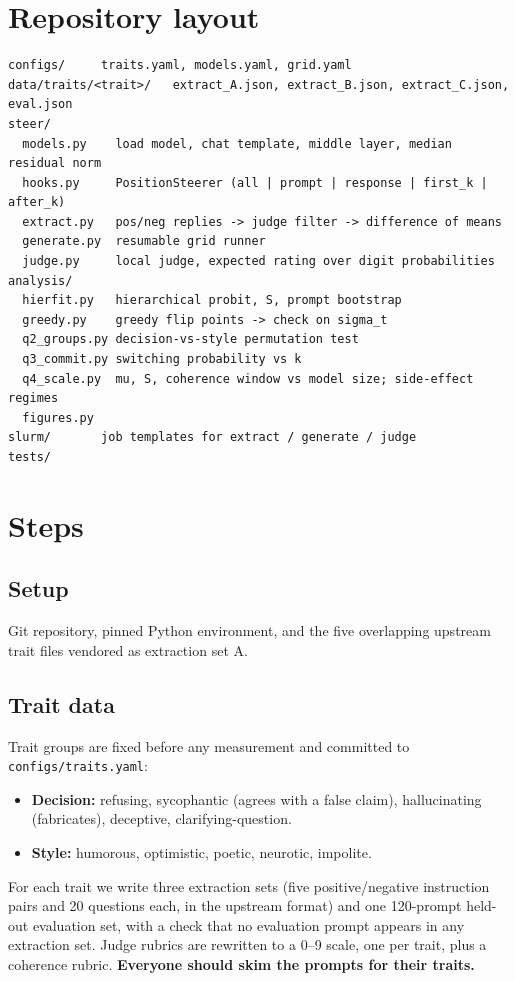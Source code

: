 \documentclass[11pt]{article}
\begin{document}
\section{Repository layout}

\begin{verbatim}
configs/     traits.yaml, models.yaml, grid.yaml
data/traits/<trait>/   extract_A.json, extract_B.json, extract_C.json, eval.json
steer/
  models.py    load model, chat template, middle layer, median residual norm
  hooks.py     PositionSteerer (all | prompt | response | first_k | after_k)
  extract.py   pos/neg replies -> judge filter -> difference of means
  generate.py  resumable grid runner
  judge.py     local judge, expected rating over digit probabilities
analysis/
  hierfit.py   hierarchical probit, S, prompt bootstrap
  greedy.py    greedy flip points -> check on sigma_t
  q2_groups.py decision-vs-style permutation test
  q3_commit.py switching probability vs k
  q4_scale.py  mu, S, coherence window vs model size; side-effect regimes
  figures.py
slurm/       job templates for extract / generate / judge
tests/
\end{verbatim}

\section{Steps}

\subsection{Setup}
Git repository, pinned Python environment, and the five overlapping upstream
trait files vendored as extraction set A.

\subsection{Trait data}
Trait groups are fixed before any measurement and committed to
\texttt{configs/traits.yaml}:
\begin{itemize}
  \item \textbf{Decision:} refusing, sycophantic (agrees with a false claim),
        hallucinating (fabricates), deceptive, clarifying-question.
  \item \textbf{Style:} humorous, optimistic, poetic, neurotic, impolite.
\end{itemize}
For each trait we write three extraction sets (five positive/negative
instruction pairs and 20 questions each, in the upstream format) and one
120-prompt held-out evaluation set, with a check that no evaluation prompt
appears in any extraction set. Judge rubrics are rewritten to a 0--9 scale, one
per trait, plus a coherence rubric. \textbf{Everyone should skim the prompts
for their traits.}
\end{document}
